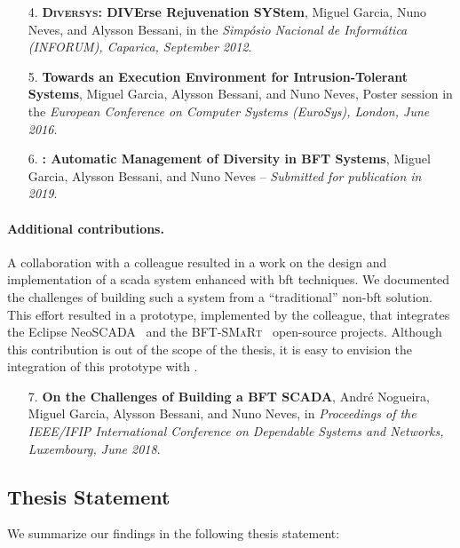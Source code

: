 \begin{enumerate}

\item[4.] \textbf{\textsc{Diversys}: DIVErse Rejuvenation SYStem}, Miguel Garcia, Nuno Neves, and Alysson Bessani, in the \emph{Simp\'{o}sio Nacional de Inform\'{a}tica (INFORUM),  Caparica, September 2012}.

\item[5.] \textbf{Towards an Execution Environment for Intrusion-Tolerant Systems}, Miguel Garcia, Alysson Bessani, and Nuno Neves, Poster session in the \emph{European Conference on Computer Systems (EuroSys), London, June 2016}.


\item[6.] \textbf{\system: Automatic Management of Diversity in BFT Systems}, Miguel Garcia, Alysson Bessani, and Nuno Neves -- \emph{Submitted for publication in 2019}.


\end{enumerate}


\paragraph{Additional contributions.}
A collaboration with a colleague resulted in a work on the design and implementation of a \gls{scada} system enhanced with \gls{bft} techniques. 
We documented the challenges of building such a system from a ``traditional'' non-\gls{bft} solution.
This effort resulted in a prototype, implemented by the colleague, that integrates the Eclipse NeoSCADA~\cite{eclipsescada} and the \textsc{BFT-SMaRt}~\cite{Bessani:2014} open-source projects.
Although this contribution is out of the scope of the thesis, it is easy to envision the integration of this prototype with \system.


\begin{enumerate}

\item[7.] \textbf{On the Challenges of Building a BFT SCADA}, Andr\'{e} Nogueira, Miguel Garcia, Alysson Bessani, and Nuno Neves, in \emph{Proceedings of the {IEEE/IFIP} International Conference on Dependable Systems and Networks, Luxembourg, June 2018}.
\end{enumerate}


\subsection{Thesis Statement}
We summarize our findings in the following thesis statement:


